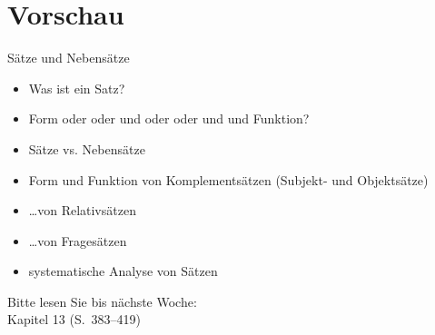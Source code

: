 \section{Vorschau}

\begin{frame}
  {Sätze und Nebensätze}
  \pause
  \begin{itemize}[<+->]
    \item Was ist ein Satz?
    \item Form oder oder und oder oder und und Funktion?
    \item Sätze vs. Nebensätze
      \Halbzeile
    \item Form und Funktion von Komplementsätzen (Subjekt- und Objektsätze)
    \item \ldots von \alert{Relativsätzen}
    \item \ldots von Fragesätzen
    \Halbzeile
  \item \alert{systematische Analyse von Sätzen}
  \end{itemize}
  \pause
  \Zeile
  \begin{center}
    Bitte lesen Sie bis nächste Woche:\\
    \alert{Kapitel 13 (S.~383--419)}
  \end{center}
  \pause
  \pause
  \pause
  \pause
  \pause
\end{frame}

